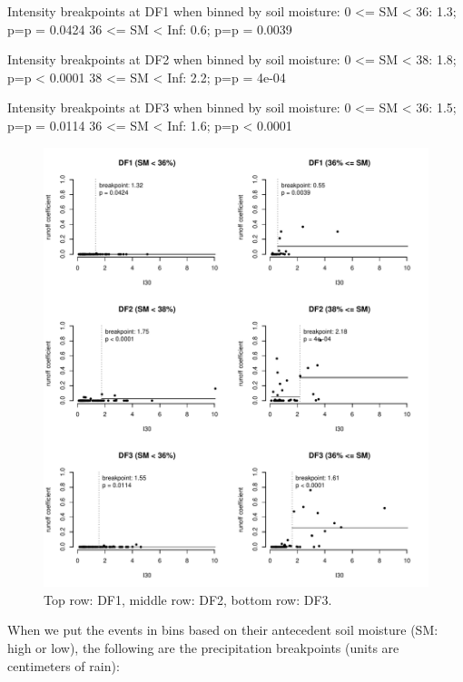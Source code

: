 \documentclass[12pt]{article}
\begin{document}
\begin{Schunk}
\begin{Soutput}
Intensity breakpoints at DF1 when binned by soil moisture:
0 <= SM < 36: 1.3; p=p = 0.0424
36 <= SM < Inf: 0.6; p=p = 0.0039

Intensity breakpoints at DF2 when binned by soil moisture:
0 <= SM < 38: 1.8; p=p < 0.0001
38 <= SM < Inf: 2.2; p=p = 4e-04

Intensity breakpoints at DF3 when binned by soil moisture:
0 <= SM < 36: 1.5; p=p = 0.0114
36 <= SM < Inf: 1.6; p=p < 0.0001
\end{Soutput}
\end{Schunk}



\begin{figure}
    \begin{center}
\includegraphics{runoff_constants-I30_binned}
    \end{center}
    \caption{Top row: DF1, middle row: DF2, bottom row: DF3.\label{I30_binned}}
\end{figure}


When we put the events in bins based on their antecedent soil moisture (SM: high or low), the following are the precipitation breakpoints (units are centimeters of rain):\\
\end{document}
